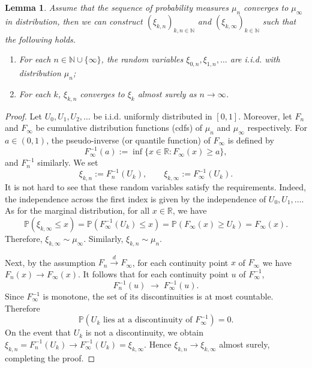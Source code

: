 \documentclass[12pt, reqno]{amsart}
\theoremstyle{plain}
\newtheorem{lemma}[theorem]{Lemma}
\theoremstyle{definition}
\newcommand\N{{\mathbb{N}}}
\newcommand\R{{\mathbb{R}}}
\renewcommand\P{{\mathbb{P}}}
\begin{document}
\begin{lemma}\label{lem:SkorokhodConstruction}
	Assume that the sequence of probability measures $\mu_{n}$ converges to $\mu_\infty$ in distribution, then we can construct $(\xi_{k, n})_{k, n\in \N}$ and $(\xi_{k, \infty})_{k\in \N}$ such that the following holds.
	\begin{enumerate}
		\item For each $n\in \N\cup \{\infty\}$, the random variables $\xi_{0, n}, \xi_{1, n}, \dots$ are i.i.d. with distribution $\mu_{n}$;
		\item For each $k$, $\xi_{k, n}$ converges to $\xi_k$ almost surely as $n\to\infty$.
	\end{enumerate}
\end{lemma}
\begin{proof}
	Let $U_0, U_1, U_2, \dots$ be i.i.d. uniformly distributed in $[0, 1]$. Moreover, let $F_n$ and $F_\infty$ be cumulative distribution functions (cdfs) of $\mu_{n}$ and $\mu_\infty$ respectively. For $a \in (0, 1)$, the pseudo-inverse (or quantile function) of $F_\infty$ is defined by
	$$ F_\infty^{-1}(a) := \inf\{ x \in \R: F_\infty(x) \ge a \},$$
	and $F_n^{-1}$ similarly. We set
	$$ \xi_{k, n} := F_n^{-1}(U_k), \qquad \xi_{k, \infty} := F_\infty^{-1}(U_k) .$$
It is not hard to see that these random variables satisfy the requirements. Indeed, the independence across the first index is given by the independence of $U_0, U_1, \dots$. As for the marginal distribution, for all $x\in \R$, we have
$$\P(\xi_{k, \infty}\le x) = \P(F_\infty^{-1}(U_k)\le x)=\P(F_\infty(x)\ge U_k) = F_\infty(x).$$
Therefore, $\xi_{k, \infty}\sim \mu_\infty$. Similarly, $\xi_{k, n}\sim \mu_{n}$.

Next, by the assumption $F_n \overset{d}{\to} F_\infty$, for each continuity point $x$ of $F_\infty$ we have $F_n(x)\to F_\infty(x)$. 
It follows that for each continuity point $u$ of $F_\infty^{-1}$,
\[
F_n^{-1}(u) \;\longrightarrow\; F_\infty^{-1}(u).
\]
Since $F_\infty^{-1}$ is monotone, the set of its discontinuities is at most countable. 
Therefore
\[
\mathbb{P}\!\left(U_k \text{ lies at a discontinuity of } F_\infty^{-1}\right) = 0.
\]
On the event that $U_k$ is not a discontinuity, we obtain $\xi_{k, n} = F_n^{-1}(U_k)\to F_\infty^{-1}(U_k)=\xi_{k,\infty}$. 
Hence $\xi_{k, n}\to \xi_{k, \infty}$ almost surely, completing the proof.
\end{proof}
\end{document}
